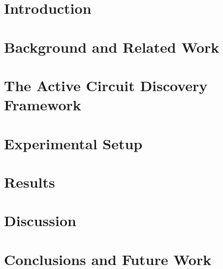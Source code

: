 \documentclass[symmetry,article,submit,pdftex,moreauthors]{Definitions/mdpi}
\begin{document}
\maketitle

\section{Introduction}
\label{sec:intro}


\section{Background and Related Work}
\label{sec:background}


\section{The Active Circuit Discovery Framework}
\label{sec:method}


\section{Experimental Setup}
\label{sec:setup}


\section{Results}
\label{sec:results}


\section{Discussion}
\label{sec:discussion}


\section{Conclusions and Future Work}
\label{sec:conclusion}

\end{document}
